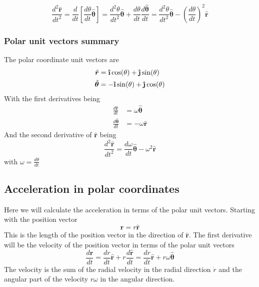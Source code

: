 \begin{equation} \label{eq:radvel}
\frac{d^2 {\hat{\bm{r}}}}{d t^2} = \frac{d}{dt}\left[ \frac{ d \theta}{d t} \hat{\bm{\theta}} \right]=\frac{d^2 \theta}{d t^2}\hat{\bm{\theta}}+\frac{d \theta}{d t} \frac{d \hat{\bm{\theta}}}{dt}=\frac{d^2 \theta}{d t^2}\hat{\bm{\theta}}-\left(\frac{d \theta}{d t} \right)^2  \hat{\bm{r}} 
\end{equation}

\begin{framed}
\subsubsection{Polar unit vectors summary}
The polar coordinate unit vectors are
\begin{align*}
\hat{\bm{r}} &= \uveci \cos( \theta ) + \uvecj \sin( \theta ) \\
\hat{\bm{\theta}}  &= - \uveci \sin( \theta ) + \uvecj \cos( \theta )
\end{align*}
With the first derivatives being
\begin{align*}
\frac{d {\hat{\bm{r}}}}{d t} &=  \omega \hat{\bm{\theta}} \\
\frac{d {\hat{\bm{\theta}}}}{d t} &=-\omega \hat{\bm{r}}
\end{align*}
And the second derivative of $\hat{\bm{r}}$ being
\begin{equation*}
\frac{d^2 {\hat{\bm{r}}}}{d t^2} =\frac{d \omega}{d t}\hat{\bm{\theta}}-\omega^2  \hat{\bm{r}} 
\end{equation*}
with $\omega = \frac{d \theta}{d t}$
\end{framed}

\subsection{Acceleration in polar coordinates}
Here we will calculate the acceleration in terms of the polar unit vectors. Starting with the position vector
\begin{equation}
\textbf{r}= r \hat{\textbf{r}}
\end{equation}
This is the length of the position vector in the direction of $\hat{\bm{r}}$. The first derivative will be the velocity of the position vector in terms of the polar unit vectors
\begin{equation}\label{eq:vel}
\frac{d \bm{r}}{d t} = \frac{d r}{d t} \hat{\bm{r}} + r \frac{d \hat{\bm{r}}}{d t}=\frac{d r}{d t} \hat{\bm{r}} + r \omega \hat{\bm{\theta}}
\end{equation}
The velocity is the sum of the radial velocity in the radial direction $\dot{r}$ and the angular part of the velocity $r \omega$ in the angular direction.


